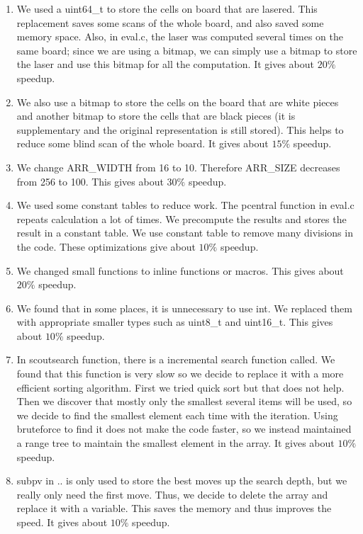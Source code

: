 \documentclass[10pt,twosidep]{article}
\begin{document}
\begin{enumerate}
	\item We used a uint64\_t to store the cells on board that are lasered. This replacement saves some scans of the whole board, and also saved some memory space. Also, in eval.c, the laser was computed several times on the same board; since we are using a bitmap, we can simply use a bitmap to store the laser and use this bitmap for all the computation. It gives about $20\%$ speedup.

	\item We also use a bitmap to store the cells on the board that are white pieces and another bitmap to store the cells that are black pieces (it is supplementary and the original representation is still stored). This helps to reduce some blind scan of the whole board.  It gives about $15\%$ speedup.

	\item We change ARR\_WIDTH from 16 to 10. Therefore ARR\_SIZE decreases from 256 to 100. This gives about $30\%$ speedup.
	\item We used some constant tables to reduce work. 
	The pcentral function in eval.c repeats calculation a lot of times. We precompute the results and stores the result in a constant table.
	We use constant table to remove many divisions in the code.
	These optimizations give about $10\%$ speedup.
	\item We changed small functions to inline functions or macros. This gives about $20\%$ speedup.
	\item We found that in some places, it is unnecessary to use int. We replaced them with appropriate smaller types such as uint8\_t and uint16\_t. This gives about $10\%$ speedup.

	\item In scoutsearch function, there is a incremental search function called. We found that this function is very slow so we decide to replace it with a more efficient sorting algorithm. First we tried quick sort but that does not help. Then we discover that mostly only the smallest several items will be used, so we decide to find the smallest element each time with the iteration. Using bruteforce to find it does not make the code faster, so we instead maintained a range tree to maintain the smallest element in the array. It gives about $10\%$ speedup. 

	\item subpv in .. is only used to store the best moves up the search depth, but we really only need the first move. Thus, we decide to delete the array and replace it with a variable. This saves the memory and thus improves the speed. It gives about $10\%$ speedup. 


\end{enumerate}
\end{document}
